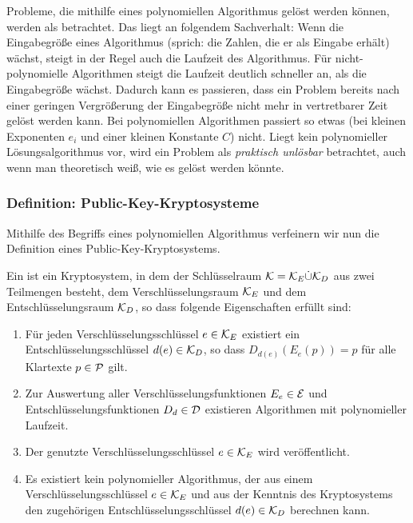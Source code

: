  Probleme, die mithilfe eines polynomiellen Algorithmus gelöst werden können, werden als  betrachtet. Das liegt an folgendem Sachverhalt: Wenn die Eingabegröße eines Algorithmus (sprich: die Zahlen, die er als Eingabe erhält) wächst, steigt in der Regel auch die Laufzeit des Algorithmus. Für nicht-polynomielle Algorithmen steigt die Laufzeit deutlich schneller an, als die Eingabegröße wächst. Dadurch kann es passieren, dass ein Problem bereits nach einer geringen Vergrößerung der Eingabegröße nicht mehr in vertretbarer Zeit gelöst werden kann. Bei polynomiellen Algorithmen passiert so etwas (bei kleinen Exponenten $e_i$ und einer kleinen Konstante $C$) nicht. Liegt kein polynomieller Lösungsalgorithmus vor, wird ein Problem als \emph{praktisch unlösbar} betrachtet, auch wenn man theoretisch weiß, wie es gelöst werden könnte. 

 \subsubsection{Definition: Public-Key-Kryptosysteme}

 Mithilfe des Begriffs eines polynomiellen Algorithmus verfeinern wir nun die Definition eines Public-Key-Kryptosystems. 
 
\begin{definition}\label{def:pkc}
 Ein  ist ein Kryptosystem, in dem der Schlüsselraum $\mathcal K = \mathcal K_E \dot\cup \mathcal K_D$ aus zwei Teilmengen besteht, dem Verschlüsselungsraum $\mathcal K_E$ und dem Entschlüsselungsraum $\mathcal K_D$, so dass folgende Eigenschaften erfüllt sind:
 \begin{enumerate}
  \item Für jeden Verschlüsselungsschlüssel $e \in \mathcal K_E$ existiert ein Entschlüsselungsschlüssel $d(e) \in \mathcal K_D$, so dass $D_{d(e)}(E_e(p)) = p$ für alle Klartexte $p \in \mathcal P$ gilt.
  \item Zur Auswertung aller Verschlüsselungsfunktionen $E_e \in \mathcal E$ und Entschlüsselungsfunktionen $D_d \in \mathcal D$ existieren Algorithmen mit polynomieller Laufzeit.
  \item Der genutzte Verschlüsselungsschlüssel $e \in \mathcal K_E$ wird veröffentlicht.
  \item Es existiert kein polynomieller Algorithmus, der aus einem Verschlüsselungsschlüssel $e \in \mathcal K_E$ und aus der Kenntnis des Kryptosystems den zugehörigen Entschlüsselungsschlüssel $d(e) \in \mathcal K_D$ berechnen kann.
 \end{enumerate}
 \end{definition}

